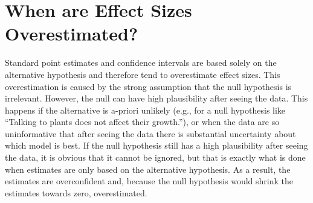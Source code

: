 \documentclass[a4paper]{article}
\begin{document}
\section*{When are Effect Sizes Overestimated?}
Standard point estimates and confidence intervals are based solely on the alternative hypothesis and therefore tend to overestimate effect sizes. This overestimation is caused by the strong assumption that the null hypothesis is irrelevant. However, the null can have high plausibility after seeing the data. This happens if the alternative is a-priori unlikely (e.g., for a null hypothesis like ``Talking to plants does not affect their growth.''), or when the data are so uninformative that after seeing the data there is substantial uncertainty about which model is best. If the null hypothesis still has a high plausibility after seeing the data, it is obvious that it cannot be ignored, but that is exactly what is done when estimates are only based on the alternative hypothesis. As a result, the estimates are overconfident and, because the null hypothesis would shrink the estimates towards zero, overestimated.
\end{document}
